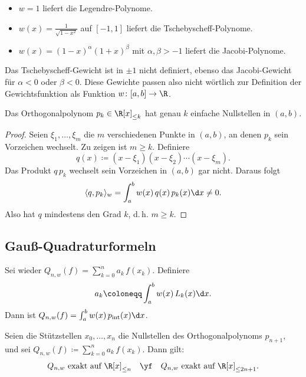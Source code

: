 \documentclass[11pt]{article}
\begin{document}
\begin{example}
  \begin{itemize}
    \item $w = 1$ liefert die Legendre-Polynome.
    \item $w(x) = \frac{1}{\sqrt{1 - x^2}}$ auf $[-1, 1]$ liefert die Tschebyscheff-Polynome.
    \item $w(x) = (1 - x)^\alpha (1 + x)^\beta$ mit $\alpha, \beta > -1$ liefert die Jacobi-Polynome.
  \end{itemize}
\end{example}
\begin{ergaenzung}
\begin{note}
  Das Tschebyscheff-Gewicht ist in $\pm 1$ nicht definiert, ebenso das Jacobi-Gewicht für $\alpha < 0$ oder $\beta < 0$. Diese Gewichte passen also nicht wörtlich zur Definition der Gewichtsfunktion als Funktion $w \colon [a, b] \to \R$.
\end{note}
\end{ergaenzung}


\begin{theorem}\Theorem
  Das Orthogonalpolynom $p_k \in \R[x]_{\le k}$ hat genau $k$ einfache Nullstellen in $(a, b)$.
\end{theorem}

\begin{proof}
  Seien $\xi_1, \dots, \xi_m$ die $m$ verschiedenen Punkte in $(a, b)$, an denen $p_k$ sein Vorzeichen wechselt. Zu zeigen ist $m \ge k$.
  Definiere
  \[ q(x) \coloneqq (x - \xi_1)(x - \xi_2) \dotsm (x - \xi_m). \]
  Das Produkt $q\, p_k$ wechselt sein Vorzeichen in $(a, b)$ gar nicht. Daraus folgt
  \[ \langle q, p_k \rangle_w = \int_a^b w(x)\, q(x)\, p_k(x) \d x \neq 0. \]
Also hat $q$ mindestens den Grad $k$, d.\,h. $m \ge k$.
\end{proof}

\subsection{Gauß-Quadraturformeln}

Sei wieder $Q_{n,w}(f) = \sum_{k=0}^{n} a_k\, f(x_k)$. Definiere
\[ a_k \coloneqq \int_a^b w(x)\, L_k(x) \d x. \]
Dann ist $Q_{n,w}(f) = \int_a^b w(x)\, p_{\mathrm{int}}(x) \d x$.


\begin{theorem}\Theorem
  Seien die Stützstellen $x_0, \dots, x_n$ die Nullstellen des Orthogonalpolynoms $p_{n+1}$, und sei $Q_{n,w}(f) \coloneqq \sum_{k=0}^{n} a_k\, f(x_k)$. Dann gilt:
  \[ Q_{n,w} \text{ exakt auf } \R[x]_{\le n} \quad \yf \quad Q_{n,w} \text{ exakt auf } \R[x]_{\le 2n+1}. \]
\end{theorem}
\end{document}
